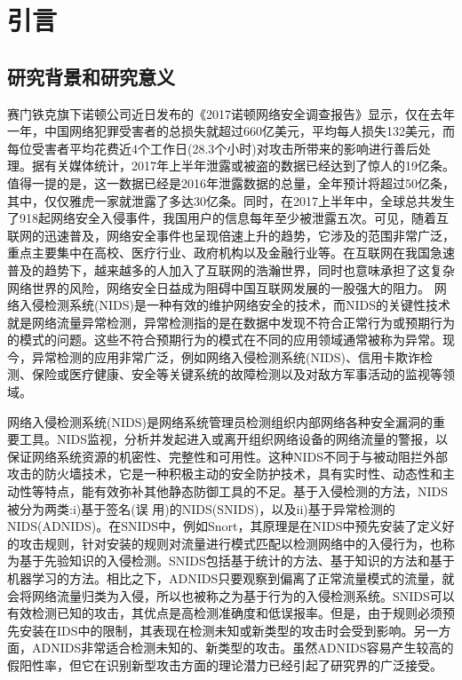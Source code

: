 \chapter{引言}\label{chap:intro}

\section{研究背景和研究意义}

赛门铁克旗下诺顿公司近日发布的《2017诺顿网络安全调查报告》显示，仅在去年一年，中国网络犯罪受害者的总损失就超过660亿美元，平均每人损失132美元，而每位受害者平均花费近4个工作日(28.3个小时)对攻击所带来的影响进行善后处理。据有关媒体统计，2017年上半年泄露或被盗的数据已经达到了惊人的19亿条。值得一提的是，这一数据已经是2016年泄露数据的总量，全年预计将超过50亿条，其中，仅仅雅虎一家就泄露了多达30亿条。同时，在2017上半年中，全球总共发生了918起网络安全入侵事件，我国用户的信息每年至少被泄露五次。可见，随着互联网的迅速普及，网络安全事件也呈现倍速上升的趋势，它涉及的范围非常广泛，重点主要集中在高校、医疗行业、政府机构以及金融行业等。在互联网在我国急速普及的趋势下，越来越多的人加入了互联网的浩瀚世界，同时也意味承担了这复杂网络世界的风险，网络安全日益成为阻碍中国互联网发展的一股强大的阻力。
网络入侵检测系统(NIDS)是一种有效的维护网络安全的技术，而NIDS的关键性技术就是网络流量异常检测，异常检测指的是在数据中发现不符合正常行为或预期行为的模式的问题。这些不符合预期行为的模式在不同的应用领域通常被称为异常。现今，异常检测的应用非常广泛，例如网络入侵检测系统(NIDS)、信用卡欺诈检测、保险或医疗健康、安全等关键系统的故障检测以及对敌方军事活动的监视等领域。

网络入侵检测系统(NIDS)是网络系统管理员检测组织内部网络各种安全漏洞的重要工具。NIDS监视，分析并发起进入或离开组织网络设备的网络流量的警报，以保证网络系统资源的机密性、完整性和可用性。这种NIDS不同于与被动阻拦外部攻击的防火墙技术，它是一种积极主动的安全防护技术，具有实时性、动态性和主动性等特点，能有效弥补其他静态防御工具的不足。基于入侵检测的方法，NIDS被分为两类:i)基于签名(误 用)的NIDS(SNIDS)，以及ii)基于异常检测的NIDS(ADNIDS)。在SNIDS中，例如Snort，其原理是在NIDS中预先安装了定义好的攻击规则，针对安装的规则对流量进行模式匹配以检测网络中的入侵行为，也称为基于先验知识的入侵检测。SNIDS包括基于统计的方法、基于知识的方法和基于机器学习的方法。相比之下，ADNIDS只要观察到偏离了正常流量模式的流量，就会将网络流量归类为入侵，所以也被称之为基于行为的入侵检测系统。SNIDS可以有效检测已知的攻击，其优点是高检测准确度和低误报率。但是，由于规则必须预先安装在IDS中的限制，其表现在检测未知或新类型的攻击时会受到影响。另一方面，ADNIDS非常适合检测未知的、新类型的攻击。虽然ADNIDS容易产生较高的假阳性率，但它在识别新型攻击方面的理论潜力已经引起了研究界的广泛接受。

